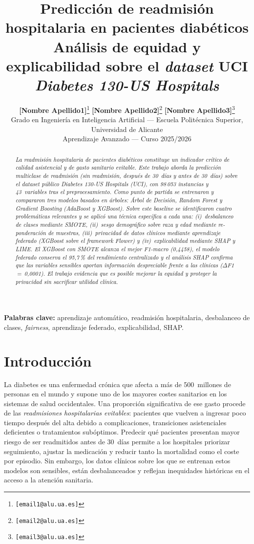 \documentclass[11pt,a4paper]{article}
\title{
    \textbf{Predicción de readmisión hospitalaria en pacientes diabéticos}\\[4pt]
    \large Análisis de equidad y explicabilidad sobre el \textit{dataset} UCI \textit{Diabetes 130-US Hospitals}
}
\author{
    \textbf{[Nombre Apellido1]}\thanks{\texttt{[email1@alu.ua.es]}}
    \quad
    \textbf{[Nombre Apellido2]}\thanks{\texttt{[email2@alu.ua.es]}}
    \quad
    \textbf{[Nombre Apellido3]}\thanks{\texttt{[email3@alu.ua.es]}}
    \\[4pt]
    \small Grado en Ingeniería en Inteligencia Artificial
    --- Escuela Politécnica Superior, Universidad de Alicante\\
    \small Aprendizaje Avanzado --- Curso 2025/2026
}
\date{}
\begin{document}
\maketitle
\thispagestyle{empty}


\begin{abstract}
\textit{La readmisión hospitalaria de pacientes diabéticos constituye un indicador crítico de calidad asistencial y de gasto sanitario evitable. Este trabajo aborda la predicción multiclase de readmisión (sin readmisión, después de 30~días y antes de 30~días) sobre el \textit{dataset} público \textit{Diabetes 130-US Hospitals} (UCI), con 98\,053 instancias y 43~variables tras el preprocesamiento. Como punto de partida se entrenaron y compararon tres modelos basados en árboles: Árbol de Decisión, \textit{Random Forest} y \textit{Gradient Boosting} (AdaBoost y XGBoost). Sobre este \textit{baseline} se identificaron cuatro problemáticas relevantes y se aplicó una técnica específica a cada una: (i)~desbalanceo de clases mediante SMOTE, (ii)~sesgo demográfico sobre raza y edad mediante re-ponderación de muestras, (iii)~privacidad de datos clínicos mediante aprendizaje federado (XGBoost sobre el \textit{framework} Flower) y (iv)~explicabilidad mediante SHAP y LIME. El XGBoost con SMOTE alcanza el mejor F1-macro (0{,}4458), el modelo federado conserva el 95{,}7\,\% del rendimiento centralizado y el análisis SHAP confirma que las variables sensibles aportan información despreciable frente a las clínicas ($\Delta$F1\,$=$\,0{,}0001). El trabajo evidencia que es posible mejorar la equidad y proteger la privacidad sin sacrificar utilidad clínica.}
\end{abstract}

\smallskip
\noindent\textbf{Palabras clave:} aprendizaje automático, readmisión hospitalaria, desbalanceo de clases, \textit{fairness}, aprendizaje federado, explicabilidad, SHAP.

\tableofcontents
\newpage


\section{Introducción}

La diabetes es una enfermedad crónica que afecta a más de 500~millones de personas en el mundo y supone uno de los mayores costes sanitarios en los sistemas de salud occidentales. Una proporción significativa de ese gasto procede de las \textit{readmisiones hospitalarias evitables}: pacientes que vuelven a ingresar poco tiempo después del alta debido a complicaciones, transiciones asistenciales deficientes o tratamientos sub\'optimos. Predecir qué pacientes presentan mayor riesgo de ser readmitidos antes de 30~días permite a los hospitales priorizar seguimiento, ajustar la medicación y reducir tanto la mortalidad como el coste por episodio. Sin embargo, los datos clínicos sobre los que se entrenan estos modelos son sensibles, están desbalanceados y reflejan inequidades históricas en el acceso a la atención sanitaria.
\end{document}
